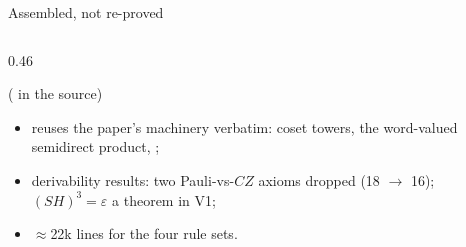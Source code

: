 \begin{frame}{Assembled, not re-proved \New}
\begin{columns}[c]
\begin{column}{0.46\textwidth}
\begin{code}
\AgdaSymbol{(}\AgdaSpace{}%
\AgdaSymbol{)}\<%
\end{code}
\begin{code}[hide]%
\>[0]\AgdaSpace{}%
\AgdaSymbol{=}\AgdaSpace{}%
\AgdaSpace{}%
\AgdaBound{\AgdaUnderscore{}}\AgdaSpace{}%
\AgdaSpace{}%
\AgdaSymbol{\AgdaUnderscore{}}\<%
\end{code}
\vspace{-2pt}
{\scriptsize ( in the source)}
\begin{itemize}
  \item reuses the paper's machinery verbatim: coset towers, the
        word-valued semidirect product, ;
  \item derivability results: two Pauli-vs-$CZ$ axioms dropped (18 $\to$ 16);
        $(SH)^3=\varepsilon$ a theorem in V1;
  \item $\approx$22k lines for the four rule sets.
\end{itemize}
\end{column}
\end{columns}
\end{frame}

